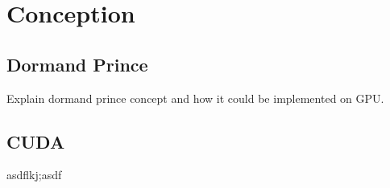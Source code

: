 \chapter{Conception}
\label{ch:conception}


\section{Dormand Prince}
\label{ch:conception:dormand_prince}

Explain dormand prince concept and how it could be implemented on GPU.

\section{CUDA}
\label{ch:conception:cuda}

asdflkj;asdf